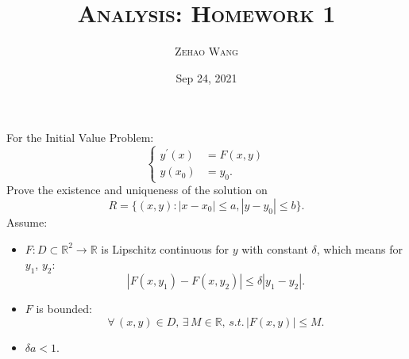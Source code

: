 \documentclass[en, normal, 11pt, black]{elegantnote}
\title{\textsc{Analysis: Homework 1}}
\author{\textsc{Zehao Wang}}
\date{Sep 24, 2021}
\newenvironment{exercise}[1]{\begin{tcolorbox}[colback=black!15, colframe=black!80, breakable, title=#1]}{\end{tcolorbox}}
\begin{document}
\maketitle
    \begin{exercise}{Picard's Theorem}
        For the Initial Value Problem: 
        \begin{equation*}
            \left\{
            \begin{aligned}
                y^\prime(x)&=F(x,y) \\
                y(x_0)&=y_0. 
            \end{aligned}
            \right.
        \end{equation*}
        Prove the existence and uniqueness of the solution on \[R=\{(x,y): |x-x_0|\leqslant a, |y-y_0|\leqslant b\}. \] 
        Assume: 
        \begin{itemize}
            \item $F:D\subset \mathbb{R}^2\to\mathbb{R}$ is Lipschitz continuous for $y$ with constant $\delta$, which means for $y_1$, $y_2$: 
            \[\left|F(x,y_1)-F(x,y_2)\right|\leqslant\delta\left|y_1-y_2\right|. \]
            \item $F$ is bounded: 
            \[\forall\,(x,y) \in D,\,\exists\,M\in \mathbb{R},\,s.t.\,\left|F(x,y)\right|\leqslant M. \]
            \item $\delta a<1$. 
        \end{itemize}
    \end{exercise}
\end{document}

